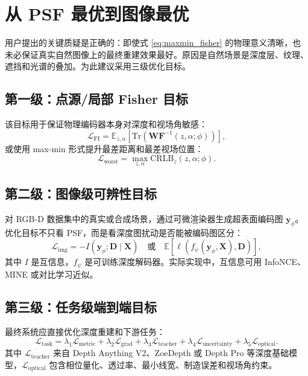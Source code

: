 \documentclass[11pt,a4paper,fontset=none]{ctexart}
\begin{document}
\section{从 PSF 最优到图像最优}

用户提出的关键质疑是正确的：即使式 \eqref{eq:maxmin_fisher} 的物理意义清晰，也未必保证真实自然图像上的最终重建效果最好。原因是自然场景是深度层、纹理、遮挡和光谱的叠加。为此建议采用三级优化目标。

\subsection{第一级：点源/局部 Fisher 目标}

该目标用于保证物理编码器本身对深度和视场角敏感：
\begin{equation}
  \mathcal L_{\mathrm{FI}}
  =
  \mathbb E_{z,\alpha}
  \left[
    \mathrm{Tr}\left(\bm W
    \bm F^{-1}(z,\alpha;\phi)\right)
  \right],
\end{equation}
或使用 max-min 形式提升最差距离和最差视场位置：
\begin{equation}
  \mathcal L_{\mathrm{worst}}
  =
  \max_{z,\alpha}
  \mathrm{CRLB}_z(z,\alpha;\phi).
\end{equation}

\subsection{第二级：图像级可辨性目标}

对 RGB-D 数据集中的真实或合成场景，通过可微渲染器生成超表面编码图 $\bm y_\phi$。优化目标不只看 PSF，而是看深度图扰动是否能被编码图区分：
\begin{equation}
  \mathcal L_{\mathrm{img}}
  =
  - I(\bm y_\phi;\bm D \mid \bm X)
  \quad \text{或} \quad
  \mathbb E
  \left[
  \ell(f_\psi(\bm y_\phi,\bm X),\bm D)
  \right],
\end{equation}
其中 $I$ 是互信息，$f_\psi$ 是可训练深度解码器。实际实现中，互信息可用 InfoNCE、MINE 或对比学习近似。

\subsection{第三级：任务级端到端目标}

最终系统应直接优化深度重建和下游任务：
\begin{equation}
  \mathcal L_{\mathrm{task}}
  =
  \lambda_1 \mathcal L_{\mathrm{metric}}
  + \lambda_2 \mathcal L_{\mathrm{grad}}
  + \lambda_3 \mathcal L_{\mathrm{teacher}}
  + \lambda_4 \mathcal L_{\mathrm{uncertainty}}
  + \lambda_5 \mathcal L_{\mathrm{optical}}.
\end{equation}
其中 $\mathcal L_{\mathrm{teacher}}$ 来自 Depth Anything V2、ZoeDepth 或 Depth Pro 等深度基础模型，$\mathcal L_{\mathrm{optical}}$ 包含相位量化、透过率、最小线宽、制造误差和视场角约束。
\end{document}

